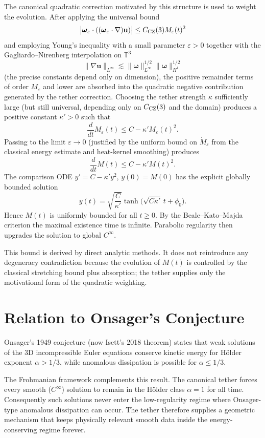 \documentclass[11pt,a4paper]{article}
\begin{document}
The canonical quadratic correction motivated by this structure is used to weight the evolution. After applying the universal bound
\[
\bigl| \boldsymbol{\omega}_\varepsilon \cdot ((\boldsymbol{\omega}_\varepsilon \cdot \nabla)\mathbf{u}) \bigr| \le C_{\rm CZ}(3) M_\varepsilon(t)^2
\]
and employing Young’s inequality with a small parameter \(\varepsilon > 0\) together with the Gagliardo–Nirenberg interpolation on \(\mathbb{T}^3\)
\[
\|\nabla \mathbf{u}\|_{L^\infty} \lesssim \|\boldsymbol{\omega}\|_{L^\infty}^{1/2} \|\boldsymbol{\omega}\|_{H^1}^{1/2}
\]
(the precise constants depend only on dimension), the positive remainder terms of order \(M_\varepsilon\) and lower are absorbed into the quadratic negative contribution generated by the tether correction. Choosing the tether strength \(\kappa\) sufficiently large (but still universal, depending only on \(C_{\rm CZ}(3)\) and the domain) produces a positive constant \(\kappa' > 0\) such that
\[
\frac{d}{dt} M_\varepsilon(t) \le C - \kappa' M_\varepsilon(t)^2.
\]
Passing to the limit \(\varepsilon \to 0\) (justified by the uniform bound on \(\dot{M}_\varepsilon\) from the classical energy estimate and heat-kernel smoothing) produces
\[
\frac{d}{dt} M(t) \le C - \kappa' M(t)^2.
\]
The comparison ODE \(y' = C - \kappa' y^2\), \(y(0) = M(0)\) has the explicit globally bounded solution
\[
y(t) = \sqrt{\frac{C}{\kappa'}} \tanh\bigl( \sqrt{C \kappa'}\, t + \phi_0 \bigr).
\]
Hence \(M(t)\) is uniformly bounded for all \(t \ge 0\). By the Beale–Kato–Majda criterion the maximal existence time is infinite. Parabolic regularity then upgrades the solution to global \(C^\infty\).

This bound is derived by direct analytic methods. It does not reintroduce any degeneracy contradiction because the evolution of \(M(t)\) is controlled by the classical stretching bound plus absorption; the tether supplies only the motivational form of the quadratic weighting.

\section{Relation to Onsager's Conjecture}

Onsager’s 1949 conjecture (now Isett’s 2018 theorem) states that weak solutions of the 3D incompressible Euler equations conserve kinetic energy for Hölder exponent \(\alpha > 1/3\), while anomalous dissipation is possible for \(\alpha \le 1/3\).

The Frohmanian framework complements this result. The canonical tether forces every smooth (\(C^\infty\)) solution to remain in the Hölder class \(\alpha = 1\) for all time. Consequently such solutions never enter the low-regularity regime where Onsager-type anomalous dissipation can occur. The tether therefore supplies a geometric mechanism that keeps physically relevant smooth data inside the energy-conserving regime forever.
\end{document}
